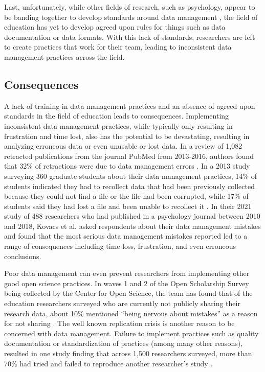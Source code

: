 \documentclass[
]{book}
\begin{document}
Last, unfortunately, while other fields of research, such as psychology, appear to be banding together to develop standards around data management \autocite{noauthor_psych-ds_nodate}, the field of education has yet to develop agreed upon rules for things such as data documentation or data formats. With this lack of standards, researchers are left to create practices that work for their team, leading to inconsistent data management practices across the field.

\hypertarget{consequences}{%
\subsection{Consequences}\label{consequences}}

A lack of training in data management practices and an absence of agreed upon standards in the field of education leads to consequences. Implementing inconsistent data management practices, while typically only resulting in frustration and time lost, also has the potential to be devastating, resulting in analyzing erroneous data or even unusable or lost data. In a review of 1,082 retracted publications from the journal PubMed from 2013-2016, authors found that 32\% of retractions were due to data management errors \autocite{campos-varela_misconduct_2019}. In a 2013 study surveying 360 graduate students about their data management practices, 14\% of students indicated they had to recollect data that had been previously collected because they could not find a file or the file had been corrupted, while 17\% of students said they had lost a file and been unable to recollect it \autocite{doucette_drowning_2013}. In their 2021 study of 488 researchers who had published in a psychology journal between 2010 and 2018, Kovacs et al. \autocite{kovacs_role_2021} asked respondents about their data management mistakes and found that the most serious data management mistakes reported led to a range of consequences including time loss, frustration, and even erroneous conclusions.

Poor data management can even prevent researchers from implementing other good open science practices. In waves 1 and 2 of the Open Scholarship Survey being collected by the Center for Open Science, the team has found that of the education researchers surveyed who are currently not publicly sharing their research data, about 10\% mentioned ``being nervous about mistakes'' as a reason for not sharing \autocite{osf_cos_2022}. The well known replication crisis is another reason to be concerned with data management. Failure to implement practices such as quality documentation or standardization of practices (among many other reasons), resulted in one study finding that across 1,500 researchers surveyed, more than 70\% had tried and failed to reproduce another researcher's study \autocite{eisenstein_pursuit_2022}.
\end{document}

